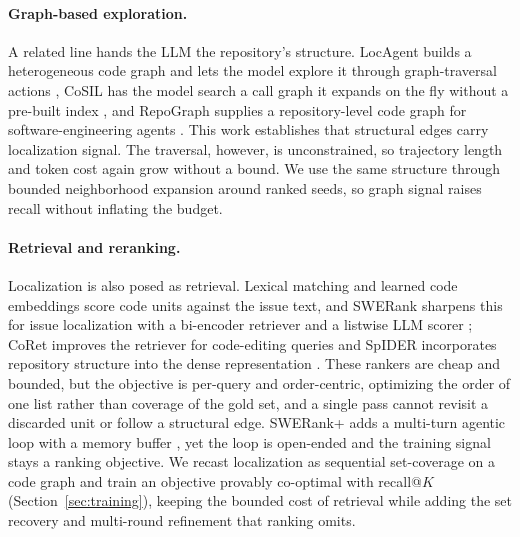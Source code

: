 \paragraph{Graph-based exploration.}
A related line hands the LLM the repository's structure.
LocAgent builds a heterogeneous code graph and lets the model
explore it through graph-traversal actions \citep{chen2025locagent},
CoSIL has the model search a call graph it expands on the fly
without a pre-built index
\citep{jiang2025cosilsoftwareissuelocalization}, and RepoGraph
supplies a repository-level code graph for software-engineering
agents \citep{ouyang2025repograph}. This work establishes that
structural edges carry localization signal. The traversal,
however, is unconstrained, so trajectory length and token cost
again grow without a bound. We use the same structure through
bounded neighborhood expansion around ranked seeds, so graph
signal raises recall without inflating the budget.

\paragraph{Retrieval and reranking.}
Localization is also posed as retrieval. Lexical matching
\citep{Robertson1994OkapiATBM25} and learned code embeddings
\citep{feng-etal-2020-codebert,
guo2021graphcodebertpretrainingcoderepresentations,
zhang2024codesage} score code units against the issue text, and
SWERank sharpens this for issue localization with a bi-encoder
retriever and a listwise LLM scorer
\citep{reddy2025sweranksoftwareissuelocalization}; CoRet
improves the retriever for code-editing queries
\citep{fehr-etal-2025-coret} and SpIDER incorporates repository
structure into the dense representation \citep{chaudhari2025spider}.
These rankers are cheap and bounded, but the objective is
per-query and order-centric, optimizing the order of one list
rather than coverage of the gold set, and a single pass cannot
revisit a discarded unit or follow a structural edge. SWERank+
adds a multi-turn agentic loop with a memory buffer
\citep{swerankplus2025}, yet the loop is open-ended and the
training signal stays a ranking objective. We recast
localization as sequential set-coverage on a code graph and
train an objective provably co-optimal with recall@$K$
(Section~\ref{sec:training}), keeping the bounded cost of
retrieval while adding the set recovery and multi-round
refinement that ranking omits.
